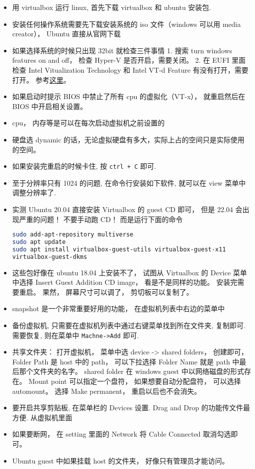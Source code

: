 \begin{itemize}
\item 用 virtualbox 运行 linux, 首先下载 virtualbox 和 ubuntu 安装包.
\item 安装任何操作系统需要先下载安装系统的 iso 文件（windows 可以用 media creator）， Ubuntu 直接从官网下载
\item 如果选择系统的时候只出现 32bit 就检查三件事情 1. 搜索 turn windows features on and off， 检查 Hyper-V 是否开启，需要关闭。 2. 在 EUFI 里面检查 Intel Vitualization Technology 和 Intel VT-d Feature 有没有打开，需要打开。 参考\href{http://www.fixedbyvonnie.com/2014/11/virtualbox-showing-32-bit-guest-versions-64-bit-host-os/}{这里}。
\item 如果启动时提示 BIOS 中禁止了所有 cpu 的虚拟化（VT-x）， 就重启然后在 BIOS 中开启相关设置。
\item cpu， 内存等是可以在每次启动虚拟机之前设置的
\item 硬盘选 dynamic 的话，无论虚拟硬盘有多大，实际上占的空间只是实际使用的空间。
\item 如果安装完重启的时候卡住, 按 \verb`ctrl + C` 即可.
\item 至于分辨率只有 1024 的问题, 在命令行安装如下软件, 就可以在 view 菜单中调整分辨率了.
\item 实测 Ubuntu 20.04 直接安装 Virtualbox 的 guest CD 即可， 但是 22.04 会出现严重的问题！ 不要手动跑 CD！ 而是运行下面的命令
\begin{lstlisting}[language=bash]
sudo add-apt-repository multiverse
sudo apt update
sudo apt install virtualbox-guest-utils virtualbox-guest-x11 
virtualbox-guest-dkms
\end{lstlisting}
\item 这些包好像在 ubuntu 18.04 上安装不了， 试图从 Virtualbox 的 Device 菜单中选择 Insert Guest Addition CD image， 看是不是同样的功能。 安装完需要重启。 果然， 屏幕尺寸可以调了， 剪切板可以复制了。
\item snapshot 是一个非常重要好用的功能， 在虚拟机列表中右边的菜单中
\item 备份虚拟机, 只需要在虚拟机列表中通过右键菜单找到所在文件夹, 复制即可. 需要恢复, 则在菜单中 \verb`Machne->Add` 即可.
\item 共享文件夹： 打开虚拟机， 菜单中选 device -> shared folders， 创建即可， Folder Path 是 host 中的 path， 可以下拉选择 Folder Name 就是 path 中最后那个文件夹的名字。 shared folder 在 windows guest 中以网络磁盘的形式存在。 Mount point 可以指定一个盘符， 如果想要自动分配盘符， 可以选择 automount。 选择 Make permanent， 重启以后也不会消失。
\item 要开启共享剪贴板, 在菜单栏的 Devices 设置. Drag and Drop 的功能传文件最方便. 从虚拟机里面
\item 如果要断网， 在 setting 里面的 Network 将 Cable Connected 取消勾选即可。
\item Ubuntu guest 中如果挂载 host 的文件夹， 好像只有管理员才能访问。
\end{itemize}

